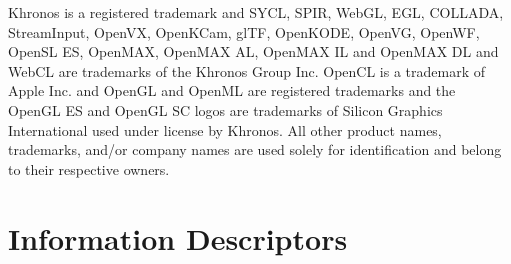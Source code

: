 \documentclass[10pt,twoside]{report}
\begin{document}
Khronos\textregistered{} is a registered trademark and
SYCL\texttrademark{}, SPIR\texttrademark{}, WebGL\texttrademark{},
EGL\texttrademark{}, COLLADA\texttrademark{},
StreamInput\texttrademark{}, OpenVX\texttrademark{},
OpenKCam\texttrademark{}, glTF\texttrademark{},
OpenKODE\texttrademark{}, OpenVG\texttrademark{},
OpenWF\texttrademark{}, OpenSL ES\texttrademark{},
OpenMAX\texttrademark{}, OpenMAX AL\texttrademark{}, OpenMAX
IL\texttrademark{} and OpenMAX DL\texttrademark{} and
WebCL\texttrademark{} are trademarks of the Khronos\textregistered{}
Group Inc.  OpenCL\texttrademark{} is a trademark of Apple Inc. and
OpenGL\textregistered{} and OpenML\textregistered{} are registered
trademarks and the OpenGL ES\texttrademark{} and OpenGL
SC\texttrademark{} logos are trademarks of Silicon Graphics
International used under license by Khronos\textregistered{}. All
other product names, trademarks, and/or company names are used solely
for identification and belong to their respective owners.


\tableofcontents
\listoftables
\listoffigures













\newpage
\appendix


\chapter{Information Descriptors}

\newpage
\renewcommand\bibname{References}



%
\clearpage
\printnoidxglossary[sort=word]
\end{document}
